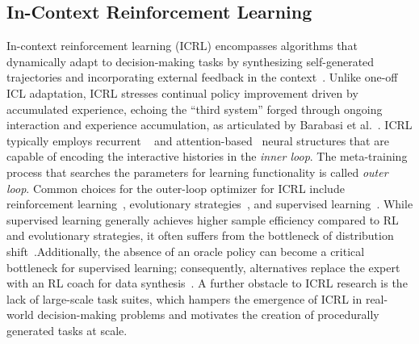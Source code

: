 \documentclass{article}
\renewcommand{\cite}[1]{\citep{#1}}
\begin{document}
\subsection{In-Context Reinforcement Learning}
In-context reinforcement learning (ICRL) encompasses algorithms that dynamically adapt to decision-making tasks by synthesizing self-generated trajectories and incorporating external feedback in the context~\citep{duan2016rl,laskin2022context}. Unlike one-off ICL adaptation, ICRL stresses continual policy improvement driven by accumulated experience, echoing the ``third system'' forged through ongoing interaction and experience accumulation, as articulated by Barabasi et al.~\cite{barabasi2025three}.
ICRL typically employs recurrent ~\cite{duan2016rl,wang2017learning} and attention-based~\cite{laskin2022context,mishra2018simple} neural structures that are capable of encoding the interactive histories in the \emph{inner loop}. The meta-training process that searches the parameters for learning functionality is called \emph{outer loop}. 
Common choices for the outer-loop optimizer for ICRL include reinforcement learning~\citep{duan2016rl, grigsbyamago, mishra2018simple}, evolutionary strategies~\citep{najarro2020meta, wang2022evolving}, and supervised learning~\citep{laskin2022context, lee2024supervised}. 
While supervised learning generally achieves higher sample efficiency compared to RL and evolutionary strategies, it often suffers from the bottleneck of distribution shift~\cite{azar2017minimax, xu2020error}.Additionally, the absence of an oracle policy can become a critical bottleneck for supervised learning; consequently, alternatives replace the expert with an RL coach for data synthesis~\citep{reed2022generalist,zhang2021end}.
A further obstacle to ICRL research is the lack of large-scale task suites, which hampers the emergence of ICRL in real-world decision-making problems and motivates the creation of procedurally generated tasks at scale.
\end{document}
